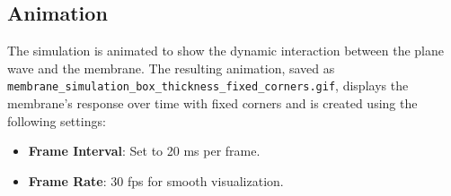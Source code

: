 \documentclass{article}
\begin{document}
\subsection{Animation}

The simulation is animated to show the dynamic interaction between the plane wave and the membrane. The resulting animation, saved as \texttt{membrane\_simulation\_box\_thickness\_fixed\_corners.gif}, displays the membrane’s response over time with fixed corners and is created using the following settings:
\begin{itemize}
    \item \textbf{Frame Interval}: Set to 20 ms per frame.
    \item \textbf{Frame Rate}: 30 fps for smooth visualization.
\end{itemize}
\end{document}

